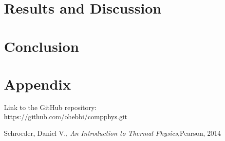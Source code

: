 \documentclass{article}
\begin{document}
\section{Results and Discussion}





\section{Conclusion}


\section{Appendix}
Link to the GitHub repository:\\

https://github.com/ohebbi/compphys.git

\begin{thebibliography}{}
Schroeder, Daniel V., \textit{An Introduction to Thermal Physics},Pearson, 2014\\
\end{thebibliography}
\end{document}
